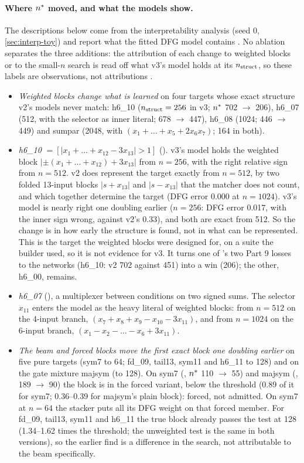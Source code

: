 \paragraph{Where $n^{*}$ moved, and what the models show.} The descriptions below come from the interpretability analysis (seed 0, \cref{sec:interp-toy}) and report what the fitted DFG model contains . No ablation separates the three additions: the attribution of each change to weighted blocks or to the small-$n$ search is read off what v3's model holds at its $n_{\rm struct}$, so these labels are observations, not attributions .
\begin{itemize}
\item \emph{Weighted blocks change what is learned} on four targets whose exact structure v2's models never match: h6\_10 ($n_{\rm struct}=256$ in v3; $n^{*}$ 702 $\to$ 206), h6\_07 (512, with the selector as inner literal; 678 $\to$ 447), h6\_08 (1024; 446 $\to$ 449) and sumpar (2048, with $(x_1+\dots+x_5+2x_6x_7)$; 164 in both).
\item \emph{h6\_10} $=[|x_1+\dots+x_{12}-3x_{13}|>1]$ (). v3's model holds the weighted block $|\pm(x_1+\dots+x_{12})+3x_{13}|$ from $n=256$, with the right relative sign from $n=512$. v2 does represent the target exactly from $n=512$, by two folded 13-input blocks $|s+x_{13}|$ and $|s-x_{13}|$ that the matcher does not count, and which together determine the target (DFG error 0.000 at $n=1024$). v3's model is nearly right one doubling earlier ($n=256$: DFG error 0.017, with the inner sign wrong, against v2's 0.33), and both are exact from 512. So the change is in how early the structure is found, not in what can be represented. This is the target the weighted blocks were designed for, on a suite the builder used, so it is not evidence for v3. It turns one of 's two Part 9 losses to the networks (h6\_10: v2 702 against  451) into a win (206); the other, h6\_00, remains.
\item \emph{h6\_07} (), a multiplexer between conditions on two signed sums. The selector $x_{11}$ enters the model as the heavy literal of weighted blocks: from $n=512$ on the 4-input branch, $(x_7+x_8+x_9-x_{10}-3x_{11})$, and from $n=1024$ on the 6-input branch, $(x_1-x_2-\dots-x_6+3x_{11})$.
\item \emph{The beam and forced blocks move the first exact block one doubling earlier} on five pure targets (sym7 to 64; fd\_09, tail13, sym11 and h6\_11 to 128) and on the gate mixture majsym (to 128). On sym7 (, $n^{*}$ 110 $\to$ 55) and majsym (, 189 $\to$ 90) the block is in the forced variant, below the threshold (0.89 of it for sym7; 0.36--0.39 for majsym's plain block): forced, not admitted. On sym7 at $n=64$ the stacker puts all its DFG weight on that forced member. For fd\_09, tail13, sym11 and h6\_11 the true block already passes the test at 128 (1.34--1.62 times the threshold; the unweighted test is the same in both versions), so the earlier find is a difference in the search, not attributable to the beam specifically.

\end{itemize}
